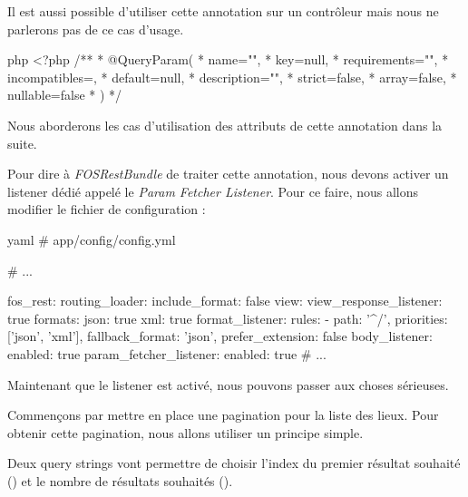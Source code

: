 \documentclass[big]{zmdocument}
\begin{document}
\begin{Information}
Il est aussi possible d'utiliser cette annotation sur un contrôleur mais nous ne parlerons pas de ce cas d'usage.
\end{Information}


\begin{CodeBlock}{php}
<?php
/**
 * @QueryParam(
 *   name="",
 *   key=null,
 *   requirements="",
 *   incompatibles={},
 *   default=null,
 *   description="",
 *   strict=false,
 *   array=false,
 *   nullable=false
 * )
 */
\end{CodeBlock}



Nous aborderons les cas d'utilisation des attributs de cette annotation dans la suite.





Pour dire à \textit{FOSRestBundle} de traiter cette annotation, nous devons activer un listener dédié appelé le \textit{Param Fetcher Listener}. 
Pour ce faire, nous allons modifier le fichier de configuration :



\begin{CodeBlock}{yaml}
# app/config/config.yml

# ...

fos_rest:
    routing_loader:
        include_format: false
    view:
        view_response_listener: true
        formats:
            json: true
            xml: true
    format_listener:
        rules:
            - { path: '^/', priorities: ['json', 'xml'], fallback_format: 'json', prefer_extension: false }
    body_listener:
        enabled: true
    param_fetcher_listener:
        enabled: true
# ...
\end{CodeBlock}



Maintenant que le listener est activé, nous pouvons passer aux choses sérieuses.







Commençons par mettre en place une pagination pour la liste des lieux. Pour obtenir cette pagination, nous allons utiliser un principe simple.



Deux query strings vont permettre de choisir l'index du premier résultat souhaité () et le nombre de résultats souhaités ().
\end{document}
